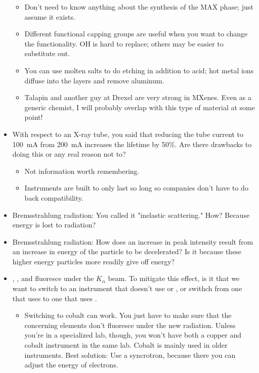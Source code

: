 \documentclass[../notes.tex]{subfiles}
\begin{document}
\begin{itemize}
\begin{itemize}
        \item Don't need to know anything about the synthesis of the MAX phase; just assume it exists.
        \item Different functional capping groups are useful when you want to change the functionality. OH is hard to replace; others may be easier to substitute out.
        \item You can use molten salts to do etching in addition to acid; hot metal ions diffuse into the layers and remove aluminum.
        \item Talapin and another guy at Drexel are very strong in MXenes. Even as a generic chemist, I will probably overlap with this type of material at some point!
    \end{itemize}
    \item With respect to an X-ray tube, you said that reducing the tube current to \SI{100}{\milli\ampere} from \SI{200}{\milli\ampere} increases the lifetime by 50\%. Are there drawbacks to doing this or any real reason not to?
    \begin{itemize}
        \item Not information worth remembering.
        \item Instruments are built to only last so long so companies don't have to do back compatibility.
    \end{itemize}
    \item Bremsstrahlung radiation: You called it "inelastic scattering." How? Because energy is lost to radiation?
    \item Bremsstrahlung radiation: How does an increase in peak intensity result from an increase in energy of the particle to be decelerated? Is it because these higher energy particles more readily give off energy?
    \item {}, , and  fluoresce under the  $K_\alpha$ beam. To mitigate this effect, is it that we want to switch to an instrument that doesn't use  or , or swithch from one that uses  to one that uses .
    \begin{itemize}
        \item Switching to cobalt can work. You just have to make sure that the concerning elements don't fluoresce under the new radiation. Unless you're in a specialized lab, though, you won't have both a copper and cobalt instrument in the same lab. Cobalt is mainly used in older instruments. Best solution: Use a syncrotron, because there you can adjust the energy of electrons.

\end{itemize}
\end{itemize}
\end{document}
